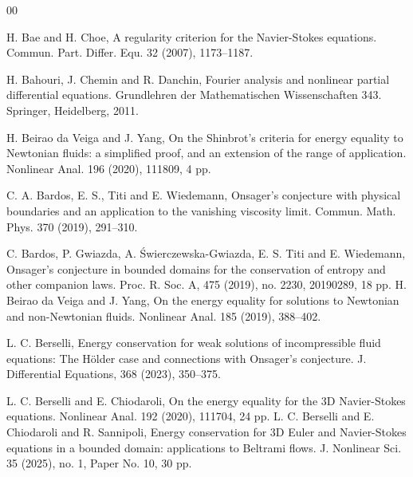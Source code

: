 \documentclass[11pt]{article}
\theoremstyle{plain}\newtheorem{definition}{Definition}[section]
\theoremstyle{definition}\newtheorem{theorem}{Theorem}[section]
\theoremstyle{plain}\newtheorem{lemma}[theorem]{Lemma}
\theoremstyle{plain}\newtheorem{coro}[theorem]{Corollary}
\theoremstyle{plain}\newtheorem{prop}[theorem]{Proposition}
\theoremstyle{remark}\newtheorem{remark}{Remark}[section]
\numberwithin{equation}{section}
\begin{document}
\begin{thebibliography}{00}






\bibitem{[BC07]}
 H. Bae and H. Choe,   A regularity criterion for the Navier-Stokes equations. Commun. Part. Differ. Equ. 32 (2007), 1173--1187.




\bibitem{[BCD]}
H. Bahouri,  J. Chemin and R. Danchin, Fourier analysis and nonlinear partial differential equations. Grundlehren der Mathematischen Wissenschaften 343. Springer, Heidelberg, 2011.











\bibitem{[BY]}H. Beirao da Veiga and J. Yang, On the Shinbrot's criteria for energy equality to Newtonian fluids: a simplified proof, and an extension of the range of application. Nonlinear Anal. 196 (2020), 111809, 4 pp.

\bibitem{[BTW]}  C.   A.  Bardos, E. S., Titi and E. Wiedemann,   Onsager's conjecture with physical boundaries
and an application to the vanishing viscosity limit. Commun. Math. Phys. 370 (2019), 291--310.


\bibitem{[BGSTW]}
 C. Bardos,  P. Gwiazda,   A. \'Swierczewska-Gwiazda,   E. S. Titi  and    E. Wiedemann,   Onsager's conjecture in bounded domains for the conservation of entropy and other companion laws. Proc. R. Soc. A, 475 (2019), no. 2230, 20190289, 18 pp.
\bibitem{[BY2]}
H. Beirao da Veiga and  J. Yang,   On the energy equality for solutions to Newtonian and non-Newtonian fluids. Nonlinear Anal. 185 (2019), 388--402.






\bibitem{[B]}L. C. Berselli,
Energy conservation for weak solutions of incompressible fluid equations: The H\"older case and connections with Onsager's conjecture.
J. Differential Equations, 368 (2023), 350--375.

\bibitem{[BC]}
L. C. Berselli and  E. Chiodaroli,  On the energy equality for the 3D Navier-Stokes
equations. Nonlinear Anal. 192 (2020), 111704, 24 pp.
\bibitem{[BCS]}
L. C. Berselli and  E. Chiodaroli and R. Sannipoli, Energy conservation for 3D Euler and Navier-Stokes equations in a bounded domain: applications to Beltrami flows. J. Nonlinear Sci. 35 (2025), no. 1, Paper No. 10, 30 pp.


\end{thebibliography}
\end{document}
